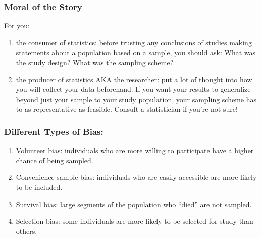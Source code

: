 \documentclass[handout]{beamer}
\newcommand{\blue}[1]{\textcolor{blue2}{#1}}
\begin{document}
\begin{frame}
\frametitle{Moral of the Story}
For you:
\begin{enumerate}
\pause \item \blue{the consumer of statistics}: before trusting any conclusions of studies making statements about a population based on a sample, you should ask:  What was the study design?  What was the sampling scheme?
\pause \item \blue{the producer of statistics AKA the researcher}:  put a lot of thought into \blue{how} you will collect your data beforehand. If you want your results to generalize \blue{beyond} just your sample to your study population, your sampling scheme has to as representative as feasible.  Consult a statistician if you're not sure!
\end{enumerate}


\end{frame}


\begin{frame}
\frametitle{Different Types of Bias:}

\begin{small}
\begin{enumerate}
\item Volunteer bias:  individuals who are more willing to participate have a higher chance of being sampled.
\item Convenience sample bias:  individuals who are easily accessible are more likely to be included.
\item Survival bias:  large segments of the population who ``died'' are not sampled.
\item Selection bias:  some individuals are more likely to be selected for study than others.
\end{enumerate}
\end{small}

\end{frame}
\end{document}
